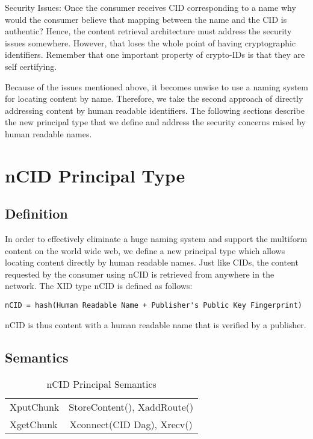 Security Issues: Once the consumer receives CID corresponding to a
name why would the consumer believe that mapping between the name and
the CID is authentic? Hence, the content retrieval architecture must
address the security issues somewhere. However, that loses the whole
point of having cryptographic identifiers. Remember that one important
property of crypto-IDs is that they are self certifying.

Because of the issues mentioned above, it becomes unwise to use a
naming system for locating content by name. Therefore, we take the
second approach of directly addressing content by human readable
identifiers. The following sections describe the new principal type
that we define and address the security concerns raised by human
readable names.

\section{nCID Principal Type}

\subsection{Definition}

In order to effectively eliminate a huge naming system and support the
multiform content on the world wide web, we define a new principal
type which allows locating content directly by human readable
names. Just like CIDs, the content requested by the consumer using
nCID is retrieved from anywhere in the network. The XID type nCID is
defined as follows:

\begin{verbatim}
nCID = hash(Human Readable Name + Publisher's Public Key Fingerprint)
\end{verbatim}
nCID is thus content with a human readable name that is verified by a
publisher.

\subsection{Semantics}

\begin{table}
  \begin{center}
    \begin{tabular}
      {l | c}
      \hline
      XputChunk & StoreContent(), XaddRoute() \\
      XgetChunk & Xconnect(CID Dag), Xrecv() \\
    \end{tabular}
    \caption{nCID Principal Semantics}
    \label{tab:ncidapis}
  \end{center}

\end{table}


